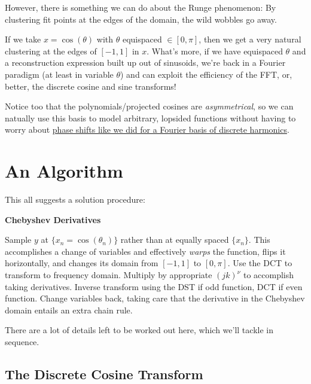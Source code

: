\documentclass[10pt]{article}
\begin{document}
However, there is something we can do about the Runge phenomenon: By clustering fit points at the edges of the domain, the wild wobbles go away.

If we take $x = \cos(\theta)$ with $\theta$ equispaced $\in [0, \pi]$, then we get a very natural clustering at the edges of $[-1, 1]$ in $x$. What's more, if we have equispaced $\theta$ and a reconstruction expression built up out of sinusoids, we're back in a Fourier paradigm (at least in variable $\theta$) and can exploit the efficiency of the FFT, or, better, the discrete cosine and sine transforms!\cite{dct}\cite{dst}

Notice too that the polynomials/projected cosines are \textit{asymmetrical}, so we can natually use this basis to model arbitrary, lopsided functions without having to worry about \hyperref[phase]{phase shifts like we did for a Fourier basis of discrete harmonics}.

\section{An Algorithm}\label{algo}

This all suggests a solution procedure:

\begin{algorithm}
\caption*{\textbf{Chebyshev Derivatives}}
\begin{algorithmic}[1] %
	\STATE Sample $y$ at $\{x_n = \cos(\theta_n)\}$ rather than at equally spaced $\{x_n\}$. This accomplishes a change of variables and effectively \textit{warps} the function, flips it horizontally, and changes its domain from $[-1, 1]$ to $[0, \pi]$.
	\STATE Use the DCT to transform to frequency domain.
	\STATE Multiply by appropriate $(jk)^\nu$ to accomplish taking derivatives.
	\STATE Inverse transform using the DST if odd function, DCT if even function.
	\STATE Change variables back, taking care that the derivative in the Chebyshev domain entails an extra chain rule.
\end{algorithmic}
\end{algorithm}

There are a lot of details left to be worked out here, which we'll tackle in sequence.

\subsection{The Discrete Cosine Transform}\label{fftdct}
\end{document}
